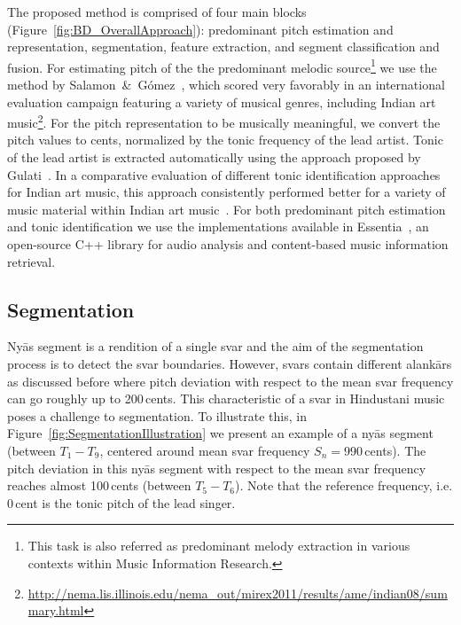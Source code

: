 {{The proposed method is comprised of four main blocks (Figure~\ref{fig:BD_OverallApproach}): predominant pitch estimation and representation, segmentation, feature extraction, and segment classification and fusion. For estimating pitch of the the predominant melodic source\footnote{This task is also referred as predominant melody extraction in various contexts within Music Information Research.} we use the method by Salamon~\&~G\'omez~\cite{Salamon2012}, which scored very favorably in an international evaluation campaign featuring a variety of musical genres, including Indian art music\footnote{\url{http://nema.lis.illinois.edu/nema_out/mirex2011/results/ame/indian08/summary.html}}. For the pitch representation to be musically meaningful, we convert the pitch values to cents, normalized by the tonic frequency of the lead artist. Tonic of the lead artist is extracted automatically using the approach proposed by Gulati~\cite{SGulati_MThesis2012}. In a comparative evaluation of different tonic identification approaches for Indian art music, this approach consistently performed better for a variety of music material within Indian art music~\cite{Gulati2013Tonic}. For both predominant pitch estimation and tonic identification we use the implementations available in Essentia~\cite{essentia}, an open-source C++ library for audio analysis and content-based music information retrieval.


\subsection{Segmentation}
\label{sec:segmentation}

Ny\={a}s segment is a rendition of a single svar and the aim of the segmentation process is to detect the svar boundaries. However, svars contain different alank\={a}rs as discussed before where pitch deviation with respect to the mean svar frequency can go roughly up to 200\,cents. This characteristic of a svar in Hindustani music poses a challenge to segmentation. To illustrate this, in Figure~\ref{fig:SegmentationIllustration} we present an example of a ny\={a}s segment (between $T_1-T_9$, centered around mean svar frequency $S_n=990$\,cents). The pitch deviation in this ny\={a}s segment with respect to the mean svar frequency reaches almost 100\,cents (between $T_5-T_6$). Note that the reference frequency, i.e. 0\,cent is the tonic pitch of the lead singer.



}}
